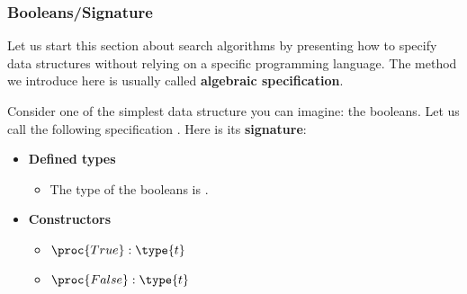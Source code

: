 
%
\begin{frame}
\frametitle{Booleans/Signature}

Let us start this section about search algorithms by presenting how to
specify data structures without relying on a specific programming
language. The method we introduce here is usually called
\textbf{algebraic specification}.

\bigskip

Consider one of the simplest data structure you can imagine: the
booleans. Let us call the following specification . Here is
its \textbf{signature}:

\begin{itemize}

  \item \textbf{Defined types}

  \begin{itemize}

    \item The type of the booleans is .

  \end{itemize}

  \item \textbf{Constructors}

  \begin{itemize}

    \item \(\proc{True} : \type{t}\)

    \item \(\proc{False} : \type{t}\)

  \end{itemize}

\end{itemize}

\end{frame}

